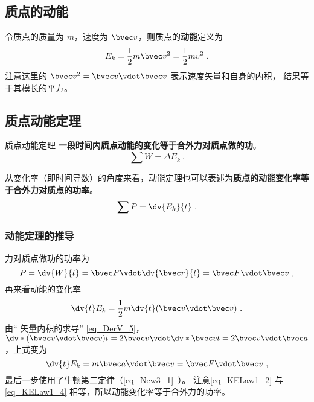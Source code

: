 
\subsection{质点的动能}
令质点的质量为 $m$，速度为 $\bvec v$，则质点的\textbf{动能}定义为
\begin{equation}
E_k = \frac12 m\bvec v^2 = \frac12 mv^2~.
\end{equation}
注意这里的 $\bvec v^2 = \bvec v \vdot \bvec v$ 表示速度矢量和自身的内积， 结果等于其模长的平方。

\subsection{质点动能定理}
\begin{theorem}{质点动能定理}
\textbf{一段时间内质点动能的变化等于合外力对质点做的功}。
\begin{equation}
\sum W=\Delta E_k~.
\end{equation}

从变化率（即时间导数）的角度来看，动能定理也可以表述为\textbf{质点的动能变化率等于合外力对质点的功率}。
\begin{equation}
\sum P=\dv{E_k}{t}~.
\end{equation}
\end{theorem}

\subsubsection{动能定理的推导}
力对质点做功的功率为
\begin{equation}\label{eq_KELaw1_2}
P = \dv{W}{t} =  \bvec F\vdot \dv{\bvec r}{t} = \bvec F\vdot\bvec v~,
\end{equation}
再来看动能的变化率
\begin{equation}
\dv{t} E_k = \frac12 m\dv{t} (\bvec v\vdot\bvec v)~.
\end{equation}
由“ 矢量内积的求导” \autoref{eq_DerV_5}，$\dv*{(\bvec v\vdot\bvec v)}{t} = 2\bvec v\vdot \dv*{\bvec v}{t} = 2\bvec v\vdot\bvec a$，上式变为
\begin{equation}\label{eq_KELaw1_4}
\dv{t} E_k = m\bvec a\vdot\bvec v = \bvec F\vdot\bvec v~,
\end{equation}
最后一步使用了牛顿第二定律（\autoref{eq_New3_1}~）。 注意\autoref{eq_KELaw1_2} 与\autoref{eq_KELaw1_4} 相等，所以动能变化率等于合外力的功率。